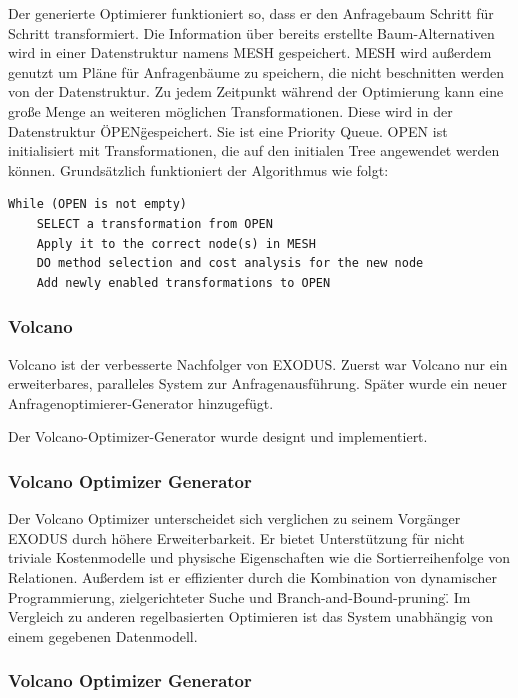 Der generierte Optimierer funktioniert so, dass er den Anfragebaum Schritt für Schritt transformiert. Die Information über bereits erstellte Baum-Alternativen wird in einer Datenstruktur namens MESH gespeichert. MESH wird außerdem genutzt um Pläne für Anfragenbäume zu speichern, die nicht beschnitten werden von der Datenstruktur. Zu jedem Zeitpunkt während der Optimierung kann eine große Menge an weiteren möglichen Transformationen. Diese wird in der Datenstruktur \"OPEN\" gespeichert. Sie ist eine Priority Queue. OPEN ist initialisiert mit Transformationen, die auf den initialen Tree angewendet werden können. Grundsätzlich funktioniert der Algorithmus wie folgt:

\begin{lstlisting}[caption={Exekution in EXODUS}]
While (OPEN is not empty)
	SELECT a transformation from OPEN
	Apply it to the correct node(s) in MESH
	DO method selection and cost analysis for the new node
	Add newly enabled transformations to OPEN

\end{lstlisting}

\subsubsection{Volcano}

Volcano ist der verbesserte Nachfolger von EXODUS. Zuerst war Volcano nur ein erweiterbares, paralleles System zur Anfragenausführung. Später wurde ein neuer Anfragenoptimierer-Generator hinzugefügt. 

Der Volcano-Optimizer-Generator wurde designt und implementiert. 





\subsubsection{Volcano Optimizer Generator}

Der Volcano Optimizer unterscheidet sich verglichen zu seinem Vorgänger EXODUS durch höhere Erweiterbarkeit. Er bietet Unterstützung für nicht triviale Kostenmodelle und physische Eigenschaften wie die Sortierreihenfolge von Relationen. Außerdem ist er effizienter durch die Kombination von dynamischer Programmierung, zielgerichteter Suche und \"Branch-and-Bound-pruning\". Im Vergleich zu anderen regelbasierten Optimieren ist das System unabhängig von einem gegebenen Datenmodell.

\subsubsection{Volcano Optimizer Generator}

